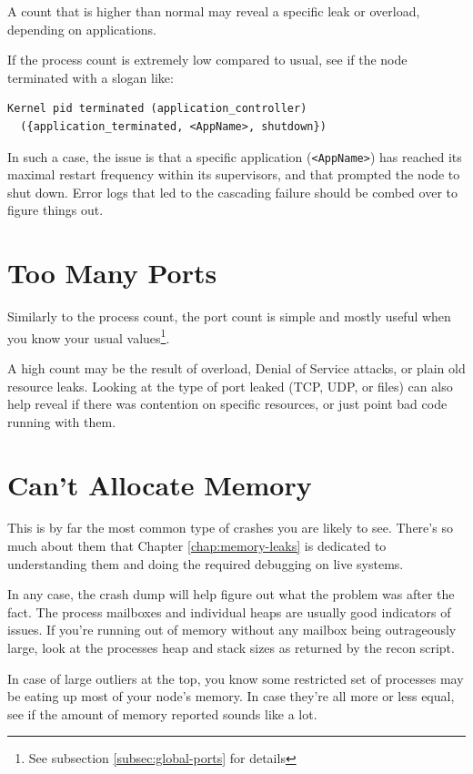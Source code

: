 \documentclass[11pt, oneside]{book}   	%
\newcommand{\expression}[1]{\Verb`#1`}
\begin{document}
A count that is higher than normal may reveal a specific leak or overload, depending on applications.

If the process count is extremely low compared to usual, see if the node terminated with a slogan like:

\begin{Verbatim}
Kernel pid terminated (application_controller)
  ({application_terminated, <AppName>, shutdown})
\end{Verbatim}

In such a case, the issue is that a specific application (\expression{<AppName>}) has reached its maximal restart frequency within its supervisors, and that prompted the node to shut down. Error logs that led to the cascading failure should be combed over to figure things out.

\section{Too Many Ports}

Similarly to the process count, the port count is simple and mostly useful when you know your usual values\footnote{See subsection \ref{subsec:global-ports} for details}.

A high count may be the result of overload, Denial of Service attacks, or plain old resource leaks. Looking at the type of port leaked (TCP, UDP, or files) can also help reveal if there was contention on specific resources, or just point bad code running with them.

\section{Can't Allocate Memory}

This is by far the most common type of crashes you are likely to see. There's so much about them that Chapter \ref{chap:memory-leaks} is dedicated to understanding them and doing the required debugging on live systems.

In any case, the crash dump will help figure out what the problem was after the fact. The process mailboxes and individual heaps are usually good indicators of issues. If you're running out of memory without any mailbox being outrageously large, look at the processes heap and stack sizes as returned by the recon script.

In case of large outliers at the top, you know some restricted set of processes may be eating up most of your node's memory. In case they're all more or less equal, see if the amount of memory reported sounds like a lot.
\end{document}
